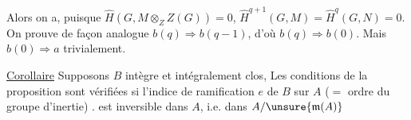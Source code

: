 Alors on a, puisque $\widehat H(G,M\otimes_Z Z(G))=0$, $\widehat H^{q+1}(G,M)=\widehat H^q(G,N)=0$. On prouve de façon analogue $b(q)\Longrightarrow b(q-1)$, d'où $b(q)\Longrightarrow b(0)$. Mais $b(0)\Longrightarrow a$ trivialement.

\uline{Corollaire} Supposons $B$  intègre et intégralement clos,  Les conditions de la proposition sont vérifiées si l'indice de ramification $e$ de $B$ sur $A$ ($={}$ ordre du groupe d'inertie)  . est inversible dans $A$, i.e.  dans $A/\unsure{\mathfrak m(A)}$ 


